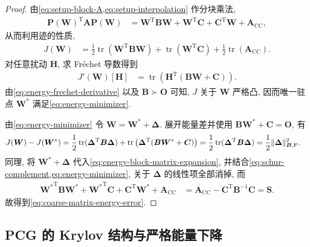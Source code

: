 \documentclass{ctexart}
\newcommand{\T}{\mathrm{T}}
\DeclareMathOperator{\tr}{tr}
\DeclarePairedDelimiter\norm{\lVert}{\rVert}
\begin{document}
\begin{proof}
由\cref{eq:setup-block-A,eq:setup-interpolation} 作分块乘法,
\begin{align}
    \bm P(\bm W)^\T\bm A\bm P(\bm W)
    &=\bm W^\T\bm B\bm W+\bm W^\T\bm C+\bm C^\T\bm W+\bm A_{\mathrm{CC}},
    \label{eq:energy-block-matrix-expansion}
\end{align}
从而利用迹的性质,
\begin{align}
    J(\bm W)
    &=\frac12\tr(\bm W^\T\bm B\bm W)
      +\tr(\bm W^\T\bm C)
      +\frac12\tr(\bm A_{\mathrm{CC}}).
    \label{eq:energy-block-expansion}
\end{align}
对任意扰动 $\bm H$, 求 Fr\'echet 导数得到
\begin{align}
    J'(\bm W)[\bm H]
    &=\tr\left(\bm H^\T(\bm B\bm W+\bm C)\right).
    \label{eq:energy-frechet-derivative}
\end{align}
由\cref{eq:energy-frechet-derivative} 以及 $\bm B\succ\mathbf O$ 可知, $J$ 关于 $\bm W$ 严格凸, 因而唯一驻点 $\bm W^{\ast}$ 满足\cref{eq:energy-minimizer}.

由\cref{eq:energy-minimizer} 令 $\bm W=\bm W^\ast+\bm\Delta$. 展开能量差并使用 $\bm B\bm W^\ast+\bm C=\mathbf O$, 有
\begin{align}
    J(\bm W)-J(\bm W^\ast)
    &=\frac12\tr(\bm\Delta^\T\bm B\bm\Delta)
      +\tr\left(\bm\Delta^\T(\bm B\bm W^\ast+\bm C)\right)=\frac12\tr(\bm\Delta^\T\bm B\bm\Delta)
     =\frac12\norm{\bm\Delta}_{\bm B,\mathrm F}^2.
    \label{eq:energy-gap-proof-explicit}
\end{align}
同理, 将 $\bm W^\ast+\bm\Delta$ 代入\cref{eq:energy-block-matrix-expansion}, 并结合\cref{eq:schur-complement,eq:energy-minimizer}, 关于 $\bm\Delta$ 的线性项全部消掉, 而
\begin{align}
    {\bm W^\ast}^\T\bm B\bm W^\ast
    +{\bm W^\ast}^\T\bm C
    +\bm C^\T\bm W^\ast
    +\bm A_{\mathrm{CC}}
    &=\bm A_{\mathrm{CC}}-\bm C^\T\bm B^{-1}\bm C
     =\bm S.
    \label{eq:endpoint-coarse-matrix-proof}
\end{align}
故得到\cref{eq:coarse-matrix-energy-error}.
\end{proof}


\subsection{PCG 的 Krylov 结构与严格能量下降}
\label{subsec:pcg-energy-geometry}
\end{document}
